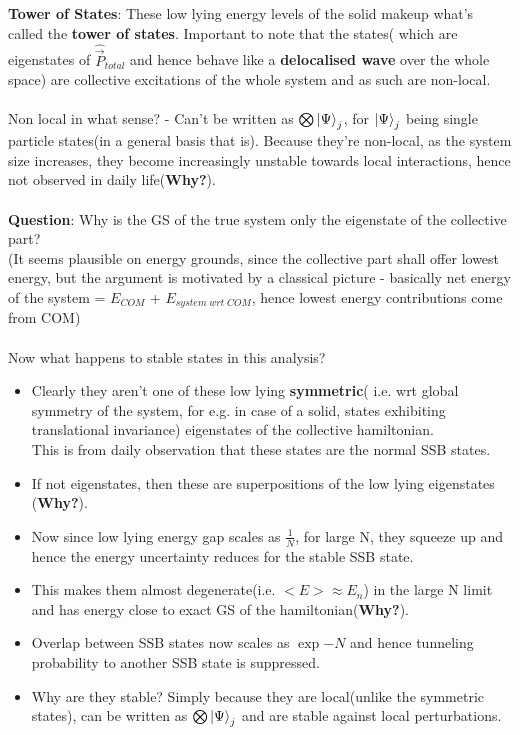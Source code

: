 \documentclass[12pt]{article}
\begin{document}
\textbf{Tower of States}:
These low lying energy levels of the solid makeup what's called the \textbf{tower of states}.
Important to note that the states( which are eigenstates of $\hat{\Vec{P}}_{total}$ and hence behave like a \textbf{delocalised wave} over the whole space) are collective excitations of the whole system and as such are non-local.\\
\\
Non local in what sense? - Can't be written as $\bigotimes \ket{\Psi}_j$, for $\ket{\Psi}_j$ being single particle states(in a general basis that is).
Because they're non-local, as the system size increases, they become increasingly unstable towards local interactions, hence not observed in daily life(\textbf{Why?}).\\
\\
\textbf{Question}: Why is the GS of the true system only the eigenstate of the collective part?\\
(It seems plausible on energy grounds, since the collective part shall offer lowest energy, but the argument is motivated by a classical picture - basically net energy of the system = $E_{COM}$ + $E_{system\;wrt\;COM}$, hence lowest energy contributions come from COM)\\
\\
Now what happens to stable states in this analysis?
\begin{itemize}
    \item Clearly they aren't one of these low lying\textbf{ symmetric}( i.e. wrt global symmetry of the system, for e.g. in case of a solid, states exhibiting translational invariance) eigenstates of the collective hamiltonian.\\
    This is from daily observation that these states are the normal SSB states.
    \item If not eigenstates, then these are superpositions of the low lying eigenstates (\textbf{Why?}).
    \item Now since low lying energy gap scales as $\displaystyle{\frac{1}{N}}$, for large N, they squeeze up and hence the energy uncertainty reduces for the stable SSB state.
    \item This makes them almost degenerate(i.e. $<E> \approx E_n$) in the large N limit and has energy close to exact GS of the hamiltonian(\textbf{Why?}).
    \item Overlap between SSB states now scales as $\exp{-N}$ and hence tunneling probability to another SSB state is suppressed.


    \item Why are they stable? Simply because they are local(unlike the symmetric states), can be written as  $\bigotimes \ket{\Psi}_j$ and are stable against local perturbations.

\end{itemize}
\end{document}
